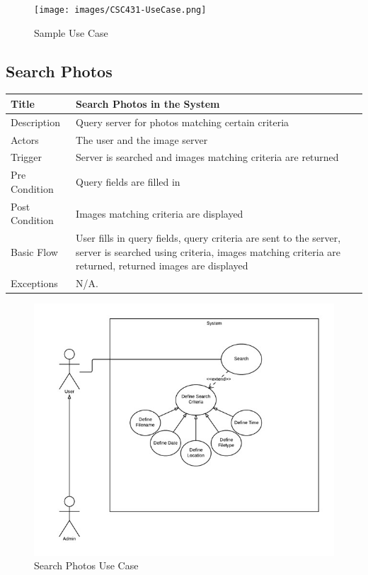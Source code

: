 \begin{figure}[h!]
  \begin{center}
    \caption{Sample Use Case}
    \label{}
    \texttt{[image: images/CSC431-UseCase.png]}
  \end{center}
\end{figure}

\newpage

\subsection{Search Photos}
  \begin{table}[h!]
    \begin{tabularx}{\textwidth}{|l|X|}
      \hline
      Title       & Search Photos in the System \\ \hline
      Description & Query server for photos matching certain criteria\\ \hline
      Actors & The user and the image server\\ \hline
      Trigger & Server is searched and images matching criteria are returned\\ \hline
      Pre Condition & Query fields are filled in\\ \hline
      Post Condition & Images matching criteria are displayed\\ \hline
      Basic Flow & User fills in query fields, query criteria are sent to the server,
 			server is searched using criteria, images matching criteria are returned,
			returned images are displayed\\ \hline
      Exceptions    &   N/A. \\ \hline
    \end{tabularx}
  \end{table}

\begin{figure}[h!]
  \begin{center}
    \caption{Search Photos Use Case}
    \label{}
    \includegraphics[width=\textwidth]{images/SearchPhotosUC.jpg}
  \end{center}
\end{figure}

